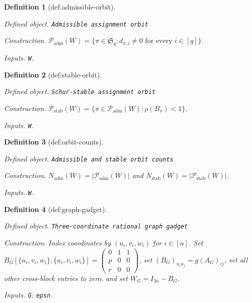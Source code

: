 \documentclass{article}
\newtheorem{definition}{Definition}
\begin{document}
\begin{definition}[def:admissible-orbit]\label{def:admissible-orbit}
\par\smallskip\noindent\emph{Defined object.} \texttt{Admissible assignment orbit}
\par\smallskip\noindent\emph{Construction.} \(\mathcal P_{\mathrm{adm}}(W)=\{\pi\in\mathfrak S_q:d_{\pi,i}\neq0\text{ for every }i\in[q]\}\).
\par\smallskip\noindent\emph{Inputs.} \texttt{W}.
\end{definition}

\begin{definition}[def:stable-orbit]\label{def:stable-orbit}
\par\smallskip\noindent\emph{Defined object.} \texttt{Schur-\allowbreak{}stable assignment orbit}
\par\smallskip\noindent\emph{Construction.} \(\mathcal P_{\mathrm{stab}}(W)=\{\pi\in\mathcal P_{\mathrm{adm}}(W):\rho(B_\pi)<1\}\).
\par\smallskip\noindent\emph{Inputs.} \texttt{W}.
\end{definition}

\begin{definition}[def:orbit-counts]\label{def:orbit-counts}
\par\smallskip\noindent\emph{Defined object.} \texttt{Admissible and stable orbit counts}
\par\smallskip\noindent\emph{Construction.} \(N_{\mathrm{adm}}(W)=|\mathcal P_{\mathrm{adm}}(W)|\) and \(N_{\mathrm{stab}}(W)=|\mathcal P_{\mathrm{stab}}(W)|\).
\par\smallskip\noindent\emph{Inputs.} \texttt{W}.
\end{definition}

\begin{definition}[def:graph-gadget]\label{def:graph-gadget}
\par\smallskip\noindent\emph{Defined object.} \texttt{Three-\allowbreak{}coordinate rational graph gadget}
\par\smallskip\noindent\emph{Construction.} Index coordinates by \((u_i,v_i,w_i)\) for \(i\in[n]\). Set \(B_G[\{u_i,v_i,w_i\},\{u_i,v_i,w_i\}]=\begin{pmatrix}0&1&1\\ p&0&0\\ r&0&0\end{pmatrix}\), set \((B_G)_{u_i u_j}=g(A_G)_{ij}\), set all other cross-block entries to zero, and set \(W_G=I_{3n}-B_G\).
\par\smallskip\noindent\emph{Inputs.} \texttt{G}; \texttt{epsn}.
\end{definition}
\end{document}
